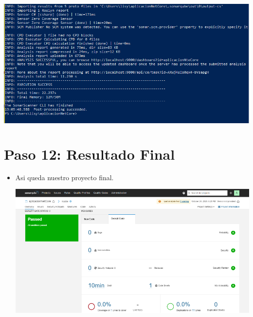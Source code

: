\begin{center}
\includegraphics[width=\columnwidth]{images/17}\newline
\end{center}

\section{Paso 12: Resultado Final }
\begin{itemize}
      \item Asi queda nuestro proyecto final.
\begin{center}
\includegraphics[width=\columnwidth]{images/18}\newline
\end{center}
\end{itemize}